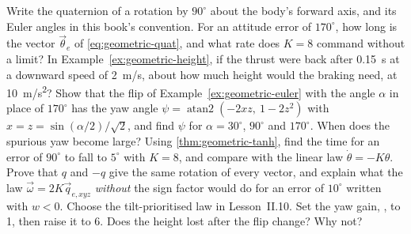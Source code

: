 \begin{exercises}
\exercise[1] Write the quaternion of a rotation by $90^\circ$ about the body's forward axis, and its Euler angles in this book's convention.
\exercise[1] For an attitude error of $170^\circ$, how long is the vector $\vec\theta_e$ of \cref{eq:geometric-quat}, and what rate does $K = 8$ command without a limit?
\exercise[1] In Example~\ref{ex:geometric-height}, if the thrust were back after \SI{0.15}{s} at a downward speed of \SI{2}{m/s}, about how much height would the braking need, at \SI{10}{m/s^2}?
\exercise[2] Show that the flip of Example~\ref{ex:geometric-euler} with the angle $\alpha$ in place of $170^\circ$ has the yaw angle $\psi = \operatorname{atan2}(-2xz,\ 1 - 2z^2)$ with $x = z = \sin(\alpha/2)/\sqrt2$, and find $\psi$ for $\alpha = 30^\circ$, $90^\circ$ and $170^\circ$. When does the spurious yaw become large?
\exercise[2] Using \cref{thm:geometric-tanh}, find the time for an error of $90^\circ$ to fall to $5^\circ$ with $K = 8$, and compare with the linear law $\dot\theta = -K\theta$.
\exercise[2] Prove that $q$ and $-q$ give the same rotation of every vector, and explain what the law $\vec\omega = 2K\vec q_{e,xyz}$ \emph{without} the sign factor would do for an error of $10^\circ$ written with $w < 0$.
\exercise[2] Choose the tilt-prioritised law in Lesson~II.10. Set the yaw gain, , to 1, then raise it to 6. Does the height lost after the flip change? Why not?

\end{exercises}
